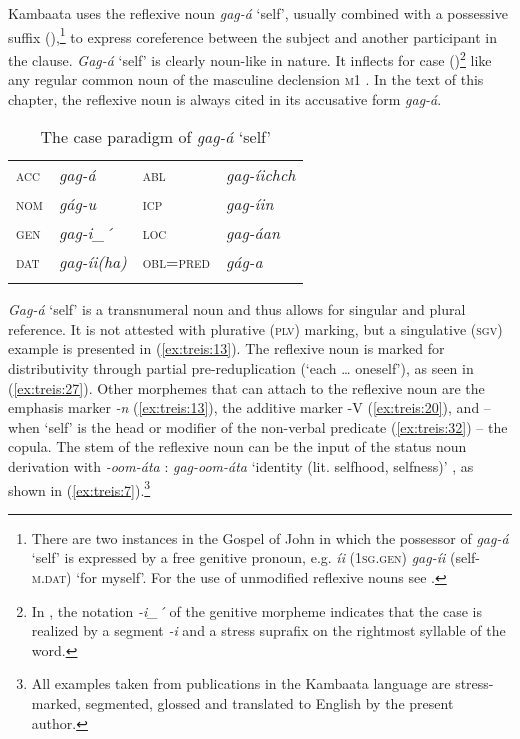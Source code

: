 \documentclass[output=paper]{langscibook}
\begin{document}
Kambaata uses the reflexive noun \textit{gag-á} ‘self’, usually combined with a possessive suffix (),\footnote{There are two instances in the Gospel of John in which the possessor of \textit{gag-á} ‘self’ is expressed by a free genitive pronoun, e.g. \textit{íi} (\textsc{1sg.gen)} \textit{gag-íi} (self-\textsc{m.dat)} ‘for myself’. For the use of unmodified reflexive nouns see .} to express coreference between the subject and another participant in the clause. \textit{Gag-á} ‘self’ is clearly noun-like in nature. It inflects for case ()\footnote{In , the notation \textit{-i\_´} of the genitive morpheme indicates that the case is realized by a segment \textit{-i} and a stress suprafix on the rightmost syllable of the word.} like any regular common noun of the masculine declension \textsc{m1} \citep[103]{Treis2008}. In the text of this chapter, the reflexive noun is always cited in its accusative form \textit{gag-á}.

\begin{table}
\caption{The case paradigm of \textit{gag-á} ‘self’}
\label{tab:treis:3}
\begin{tabular}{llll}
\lsptoprule
\textsc{acc} & \textit{gag-á} & \textsc{abl} & \textit{gag-íichch}\\
\textsc{nom} & \textit{gág-u} & \textsc{icp} & \textit{gag-íin}\\
\textsc{gen} & \textit{gag-i\_´} & \textsc{loc} & \textit{gag-áan}\\
\textsc{dat} & \textit{gag-íi(ha)} & \textsc{obl=pred} & \textit{gág-a}\\
\lspbottomrule
\end{tabular}
\end{table}

\textit{Gag-á} ‘self’ is a transnumeral noun and thus allows for singular and plural reference. It is not attested with plurative (\textsc{plv)} marking, but a singulative (\textsc{sgv)} example is presented in (\ref{ex:treis:13}). The reflexive noun is marked for distributivity through partial pre-reduplication (‘each … oneself’), as seen in (\ref{ex:treis:27}). Other morphemes that can attach to the reflexive noun are the emphasis marker \textit{-n} (\ref{ex:treis:13}), the additive marker -V (\ref{ex:treis:20}), and – when ‘self’ is the head or modifier of the non-verbal predicate (\ref{ex:treis:32}) – the copula. The stem of the reflexive noun can be the input of the status noun derivation with \textit{-oom-áta} \citep[171]{Treis2008}: \textit{gag-oom-áta} ‘identity (lit. selfhood, selfness)’ \citep[349]{Alemu2016}, as shown in (\ref{ex:treis:7}).\footnote{All examples taken from publications in the Kambaata language are stress-marked, segmented, glossed and translated to English by the present author.}
\end{document}
